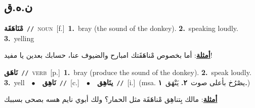\documentclass[10pt,a4paper,twoside]{article} %
\begin{document}
\begin{multicols}{2}
\vspace{-3mm}
\subsection*{\color{blue}\foreignlanguage{arabic}{ن.ه.ق}\color{blue}{}} 

{\setlength\topsep{0pt}\textbf{\foreignlanguage{arabic}{مْنَاهَقَة}}\ {\color{gray}\texttt{//}\color{black}}\ \textsc{noun}\ [f.]\ \textbf{1.}~bray (the sound of the donkey).  \textbf{2.}~speaking loudly.  \textbf{3.}~yelling\  \begin{flushright}\color{gray}\foreignlanguage{arabic}{\textbf{\underline{\foreignlanguage{arabic}{أمثلة}}}: أما بخصوص مْناهَقَتك امبارح والضيوف عنا، حسابك بعدين يا مفيد!}\end{flushright}\color{black}} \vspace{2mm}

{\setlength\topsep{0pt}\textbf{\foreignlanguage{arabic}{نَاهَق}}\ {\color{gray}\texttt{//}\color{black}}\ \textsc{verb}\ [p.]\ \textbf{1.}~bray (produce the sound of the donkey).  \textbf{2.}~speak loudly.  \textbf{3.}~yell\ \ $\bullet$\ \ \setlength\topsep{0pt}\textbf{\foreignlanguage{arabic}{نَاهِق}}\ {\color{gray}\texttt{//}\color{black}}\ [c.]\ \ $\bullet$\ \ \setlength\topsep{0pt}\textbf{\foreignlanguage{arabic}{ينَاهِق}}\ {\color{gray}\texttt{//}\color{black}}\ [i.]\ \color{gray}(msa. \foreignlanguage{arabic}{يصْرُخ بأعلى صوت}~\foreignlanguage{arabic}{\textbf{٢.}}  \foreignlanguage{arabic}{يَنْهَق}~\foreignlanguage{arabic}{\textbf{١.}})\color{black}\  \begin{flushright}\color{gray}\foreignlanguage{arabic}{\textbf{\underline{\foreignlanguage{arabic}{أمثلة}}}: مالك بِتناهِق مْناهَقَة مثل الحمار؟ ولك أبوي نايم هسه بصحى بسببك}\end{flushright}\color{black}} \vspace{2mm}


\end{multicols}
\end{document}
